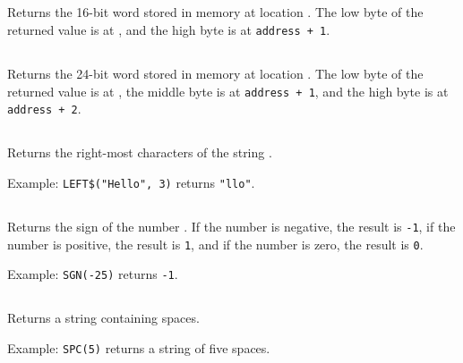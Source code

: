 \documentclass{report}
\begin{document}
    \subsection*{}

    Returns the 16-bit word stored in memory at location .
    The low byte of the returned value is at , and the
    high byte is at \verb-address + 1-.

    \subsection*{}

    Returns the 24-bit word stored in memory at location .
    The low byte of the returned value is at ,
    the middle byte is at \verb-address + 1-, 
    and the high byte is at \verb-address + 2-.

    \subsection*{}

    Returns the right-most  characters of the string .

    Example: \verb+LEFT$("Hello", 3)+ returns \verb+"llo"+.
    
    \subsection*{}

    Returns the sign of the number .
    If the number is negative, the result is \verb+-1+,
    if the number is positive, the result is \verb+1+,
    and if the number is zero, the result is \verb+0+.

    Example: \verb+SGN(-25)+ returns \verb+-1+.

    \subsection*{}

    Returns a string containing  spaces.
    
    Example: \verb+SPC(5)+ returns a string of five spaces.

    \subsection*{}
\end{document}
